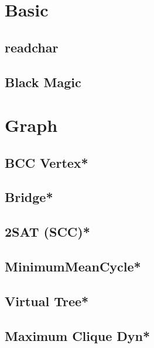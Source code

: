 \section{Basic}
\subsection{readchar}

\subsection{Black Magic}

% 


\section{Graph}
\subsection{BCC Vertex*} %

\subsection{Bridge*} %

\subsection{2SAT (SCC)*} %

\subsection{MinimumMeanCycle*} %

\subsection{Virtual Tree*} %

\subsection{Maximum Clique Dyn*} %
 

